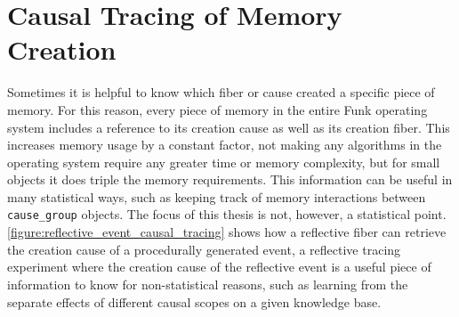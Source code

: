 \section{Causal Tracing of Memory Creation}

Sometimes it is helpful to know which fiber or cause created a
specific piece of memory.  For this reason, every piece of memory in
the entire Funk operating system includes a reference to its creation
cause as well as its creation fiber.  This increases memory usage by a
constant factor, not making any algorithms in the operating system
require any greater time or memory complexity, but for small objects
it does triple the memory requirements.  This information can be
useful in many statistical ways, such as keeping track of memory
interactions between {\tt{cause\_group}} objects.  The focus of this
thesis is not, however, a statistical point.
{\mbox{\autoref{figure:reflective_event_causal_tracing}}} shows how a
reflective fiber can retrieve the creation cause of a procedurally
generated event, a reflective tracing experiment where the creation
cause of the reflective event is a useful piece of information to know
for non-statistical reasons, such as learning from the separate
effects of different causal scopes on a given knowledge base.
